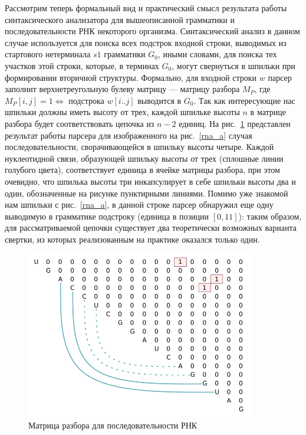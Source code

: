 Рассмотрим теперь формальный вид и практический смысл результата работы синтаксического анализатора для вышеописанной грамматики и последовательности РНК некоторого организма. Синтаксический анализ в данном случае используется для поиска всех подстрок входной строки, выводимых из стартового нетерминала $s1$ грамматики $G_0$, иными словами, для поиска тех участков этой строки, которые, в терминах $G_0$, могут свернуться в шпильки при формировании вторичной структуры. Формально, для входной строки $w$ парсер заполнит верхнетреугольную булеву матрицу --- матрицу разбора $M_P$, где $M_P[i,j]=1 \iff$ подстрока $w[i..j]$ выводится в $G_0$. Так как интересующие нас шпильки должны иметь высоту от трех, каждой шпильке высоты $n$ в матрице разбора будет соответствовать цепочка из $n - 2$ единиц. На рис.~\ref{mtrx} представлен результат работы парсера для изображенного на рис.~\ref{rna_a} случая последовательности, сворачивающейся в шпильку высоты четыре. Каждой нуклеотидной связи, образующей шпильку высоты от трех (сплошные линии голубого цвета), соответствует единица в ячейке матрицы разбора, при этом очевидно, что шпилька высоты три инкапсулирует в себе шпильки высоты два и один, обозначенные на рисунке пунктирными линиями. Помимо уже знакомой нам шпильки с рис.~\ref{rna_a}, в данной строке парсер обнаружил еще одну выводимую в грамматике подстроку (единица в позиции $[0,11]$): таким образом, для рассматриваемой цепочки существует два теоретически возможных варианта свертки, из которых реализованным на практике оказался только один.

\begin{figure}[h]
\begin{center}
\centering
\includegraphics[width=10.0cm]{pics/matrix.pdf}
\caption{Матрица разбора для последовательности РНК}
\label{mtrx}
\end{center}
\end{figure} 
\vspace{3mm}

